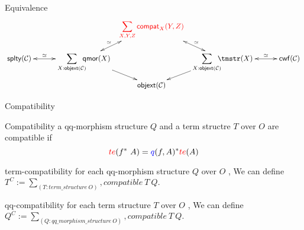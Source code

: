 \documentclass[
  ignorenonframetext,
  aspectratio=169,
  usenames,
  dvipsnames
]{beamer}
\newcommand{\constfont}[1]{\ensuremath{\mathsf{#1}}}
\newcommand{\CC}{{\mathcal{C}}}
\newcommand{\stype}{\constfont{splty}}
\newcommand{\cwf}{\constfont{cwf}}
\newcommand{\compat}{\constfont{compat}}
\newcommand{\qmor}{\constfont{qmor}}
\newcommand{\objext}{\constfont{objext}}
\newcommand{\rl}[1]{\color{red}#1\color{black}}
\newcommand{\bl}[1]{\color{blue}#1\color{black}}
\begin{document}
\begin{frame}{Equivalence}
  \[ \xymatrix@C=0.5 pc@R=3ex{
     & & & & \displaystyle \rl{\sum_{X,Y,Z} \compat_X(Y,Z)} \ar@{<->}[ld]_-{\simeq} \ar@{<->}[rd]^-{\simeq}
     \\
     \stype(\CC) \ar@{<->}[rrr]^-{\simeq}
     & & & \displaystyle \sum_{X : \objext(\CC)} \!\!\!\! \qmor(X) \ar[dr]
     &
     & \displaystyle \sum_{X : \objext(\CC)} \!\!\!\! \tmstr(X) \ar[dl] \ar@{<->}[rrr]^-{\simeq}
     & & & \cwf(\CC)
     \\
     & & & & \objext(\CC)
  } \]
  \end{frame}

\begin{frame}{Compatibility}
  \begin{block}{Compatibility}
    a qq-morphism structure $Q$ and a term structre $T$ over $O$ are compatible if $$\rl{te} (f^*\ A) = \bl{q}(f,A)^*\rl{te}(A)$$  
   \end{block}
   \begin{block}{term-compatibility}
for each qq-morphism structure $Q$ over $O$ , We can define $T^C := \sum_{(T : term\_structure\ O)} , compatible\ T\ Q.$
   \end{block}
   \begin{block}{qq-compatibility}
    for each term structure $T$ over $O$ , We can define $Q^C := \sum_{(Q : qq\_morphism\_structure\ O)} , compatible\ T\ Q.$
   \end{block}
\end{frame}
\end{document}
